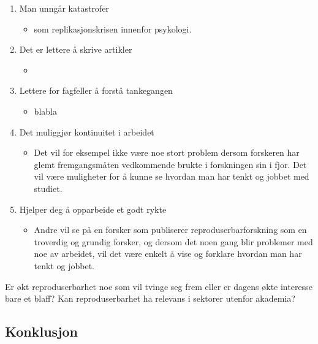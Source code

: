 \documentclass[
  12pt,
]{article}
\providecommand{\tightlist}{%
  \setlength{\itemsep}{0pt}\setlength{\parskip}{0pt}}
\begin{document}
\begin{enumerate}
\def\labelenumi{\arabic{enumi}.}
\item
  Man unngår katastrofer

  \begin{itemize}
  \tightlist
  \item
    som replikasjonskrisen innenfor psykologi.
  \end{itemize}
\item
  Det er lettere å skrive artikler

  \begin{itemize}
  \tightlist
  \item
  \end{itemize}
\item
  Lettere for fagfeller å forstå tankegangen

  \begin{itemize}
  \tightlist
  \item
    blabla
  \end{itemize}
\item
  Det muliggjør kontinuitet i arbeidet

  \begin{itemize}
  \tightlist
  \item
    Det vil for eksempel ikke være noe stort problem dersom forskeren
    har glemt fremgangsmåten vedkommende brukte i forskningen sin i
    fjor. Det vil være muligheter for å kunne se hvordan man har tenkt
    og jobbet med studiet.
  \end{itemize}
\item
  Hjelper deg å opparbeide et godt rykte

  \begin{itemize}
  \tightlist
  \item
    Andre vil se på en forsker som publiserer reproduserbarforskning som
    en troverdig og grundig forsker, og dersom det noen gang blir
    problemer med noe av arbeidet, vil det være enkelt å vise og
    forklare hvordan man har tenkt og jobbet.
  \end{itemize}
\end{enumerate}

Er økt reproduserbarhet noe som vil tvinge seg frem eller er dagens økte
interesse bare et blaff? Kan reproduserbarhet ha relevans i sektorer
utenfor akademia?

\hypertarget{konklusjon}{%
\subsection{Konklusjon}\label{konklusjon}}
\end{document}
